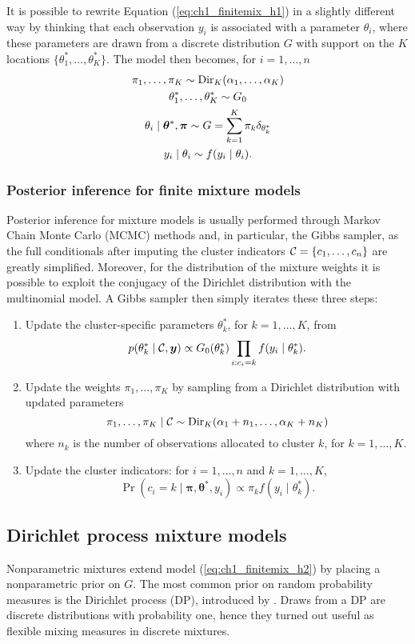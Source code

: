 It is possible to rewrite Equation (\ref{eq:ch1_finitemix_h1}) in a slightly different way by thinking that each observation $y_i$ is associated with a parameter $\theta_i$, where these parameters are drawn from a discrete distribution $G$ with support on the $K$ locations $\{\theta^*_1,\dots,\theta^*_K\}$. The model then becomes, for $i=1,\dots,n$
\begin{equation}
\begin{gathered}
\pi_1,\dots,\pi_K \sim \Dir_K(\alpha_1,\dots,\alpha_K) \\
\theta^*_1,\dots,\theta^*_K \sim G_0\\
\theta_i \mid \bm{\theta}^*,\bm{\pi} \sim G = \sum_{k=1}^K \pi_k \delta_{\theta^*_k}\\
y_i \mid \theta_i \sim f(y_i\mid\theta_i).
\end{gathered}
\label{eq:ch1_finitemix_h2}
\end{equation}

\subsubsection*{Posterior inference for finite mixture models}
Posterior inference for mixture models is usually performed through Markov Chain Monte Carlo (MCMC) methods and, in particular, the Gibbs sampler, as the full conditionals after imputing the cluster indicators $\mathcal{C} = \{c_1,\dots,c_n\}$ are greatly simplified.
Moreover, for the distribution of the mixture weights it is possible to exploit the conjugacy of the Dirichlet distribution with the multinomial model. A Gibbs sampler then simply iterates these three steps:
\begin{enumerate}
	\item Update the cluster-specific parameters $\theta^*_k$, for $k=1,\dots,K$, from
	$$ p(\theta^*_k \mid \mathcal{C}, \bm{y}) \propto G_0(\theta^*_k) \prod_{i:c_i=k} f(y_i\mid\theta^*_{k}). $$
	\item Update the weights $\pi_1,\dots,\pi_K$ by sampling from a Dirichlet distribution with updated parameters
	$$ \pi_1,\dots,\pi_K\mid \mathcal{C} \sim  \mathrm{Dir}_K(\alpha_1 + n_1,\dots,\alpha_K + n_K) $$
	where $n_k$ is the number of observations allocated to cluster $k$, for $k=1,\dots,K$.
	\item Update the cluster indicators: for $i=1,\dots,n$ and $k=1,\dots,K$,
	$$ \Pr(c_i = k\mid \bm{\pi},\bm{\theta}^*, y_i) \propto \pi_k f(y_i\mid\theta^*_{k})  .$$
\end{enumerate}

\subsection{Dirichlet process mixture models}
Nonparametric mixtures extend model (\ref{eq:ch1_finitemix_h2}) by placing a nonparametric prior on $G$. The most common prior on random probability measures is the Dirichlet process (DP), introduced by \citet{ferguson1973, ferguson1974}. Draws from a DP are discrete distributions with probability one, hence they turned out useful as flexible mixing measures in discrete mixtures.

